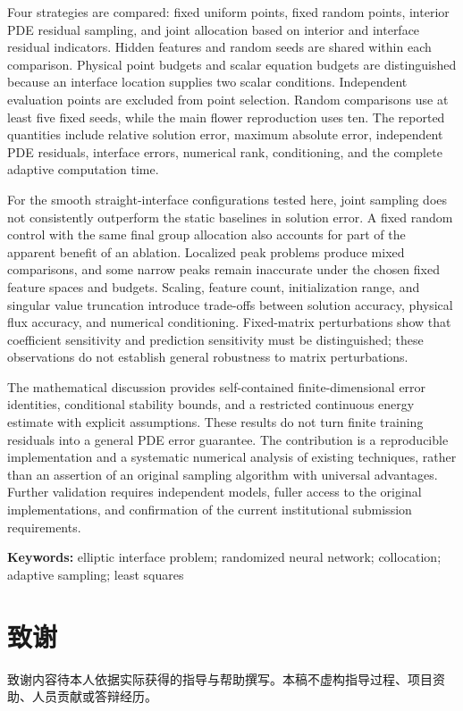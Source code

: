 \documentclass[UTF8,12pt,oneside]{ctexbook}
\theoremstyle{definition}
\begin{document}
Four strategies are compared: fixed uniform points, fixed random points, interior PDE residual sampling, and joint allocation based on interior and interface residual indicators. Hidden features and random seeds are shared within each comparison. Physical point budgets and scalar equation budgets are distinguished because an interface location supplies two scalar conditions. Independent evaluation points are excluded from point selection. Random comparisons use at least five fixed seeds, while the main flower reproduction uses ten. The reported quantities include relative solution error, maximum absolute error, independent PDE residuals, interface errors, numerical rank, conditioning, and the complete adaptive computation time.

For the smooth straight-interface configurations tested here, joint sampling does not consistently outperform the static baselines in solution error. A fixed random control with the same final group allocation also accounts for part of the apparent benefit of an ablation. Localized peak problems produce mixed comparisons, and some narrow peaks remain inaccurate under the chosen fixed feature spaces and budgets. Scaling, feature count, initialization range, and singular value truncation introduce trade-offs between solution accuracy, physical flux accuracy, and numerical conditioning. Fixed-matrix perturbations show that coefficient sensitivity and prediction sensitivity must be distinguished; these observations do not establish general robustness to matrix perturbations.

The mathematical discussion provides self-contained finite-dimensional error identities, conditional stability bounds, and a restricted continuous energy estimate with explicit assumptions. These results do not turn finite training residuals into a general PDE error guarantee. The contribution is a reproducible implementation and a systematic numerical analysis of existing techniques, rather than an assertion of an original sampling algorithm with universal advantages. Further validation requires independent models, fuller access to the original implementations, and confirmation of the current institutional submission requirements.

\noindent\textbf{Keywords:} elliptic interface problem; randomized neural network; collocation; adaptive sampling; least squares
\tableofcontents
\mainmatter







\appendix

\backmatter
\chapter*{致谢}
致谢内容待本人依据实际获得的指导与帮助撰写。本稿不虚构指导过程、项目资助、人员贡献或答辩经历。
\end{document}
